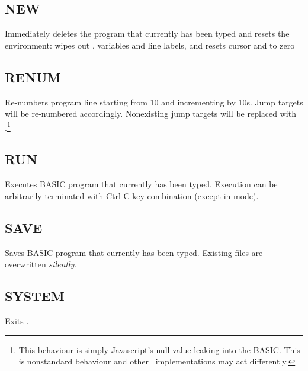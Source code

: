 \subsection{NEW}
    \par
    Immediately deletes the program that currently has been typed and resets the environment: wipes out , variables and line labels, and resets  cursor and  to zero
    
\subsection{RENUM}
    \par
    Re-numbers program line starting from 10 and incrementing by 10s. Jump targets will be re-numbered accordingly. Nonexisting jump targets will be replaced with .\footnote{This behaviour is simply Javascript's null-value leaking into the BASIC. This is nonstandard behaviour and other \tbas\ implementations may act differently.}
    
\subsection{RUN}
    \par
    Executes BASIC program that currently has been typed. Execution can be arbitrarily terminated with Ctrl-C key combination (except in  mode).
    
\subsection{SAVE}
    \par
    Saves BASIC program that currently has been typed. Existing files are overwritten \emph{silently}.

\subsection{SYSTEM}
    \par
    Exits \tbas.
